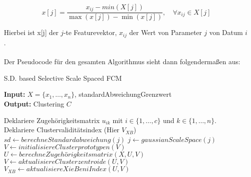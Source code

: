 \documentclass[11pt,ceqn]{book}
\begin{document}
$$x[j] = \frac{x_{ij}-min(X[j])}{\max(x[j])-\min(x[j])},\quad \forall x_{ij} \in X[j]$$

Hierbei ist x[j] der $j$-te Featurevektor, $x_{ij}$ der Wert von Parameter $j$ von Datum $i$.
\\~\\
Der Pseudocode für den gesamten Algorithmus sieht dann folgendermaßen aus:

\begin{algorithm}[H]
\caption{ S.D. based Selective Scale Spaced FCM}\label{sdbsssfcm}
\hspace*{\algorithmicindent} \textbf{Input:} $X=\{x_1,\dots,x_n\}$, standardAbweichungGrenzwert\\
 \hspace*{\algorithmicindent} \textbf{Output:} Clustering $C$ 
\begin{algorithmic}[1]
\State Deklariere Zugehörigkeitsmatrix $u_{ik}$ mit $i\in \{1,\dots,c\}$ und $k \in \{1,\dots,n\}$.
\State Deklariere Clustervaliditätsindex (Hier $V_{XB}$)
	\State $sd \gets berechneStandardabweichung(j)$
		 \State $j \gets gaussianScaleSpace(j)$ 
	\EndIf
\EndFor
\State $V\gets initialisiereClusterprototypen(V)$
	\State $U\gets berechneZugehörigkeitsmatrix(X,U,V)$
	\State $V\gets aktualisiereClusterzentroide(U,V)$
	\State $V_{XB} \gets aktualisiereXieBeniIndex(U,V)$
\EndWhile
\end{algorithmic}
\end{algorithm}

\clearpage
\end{document}
